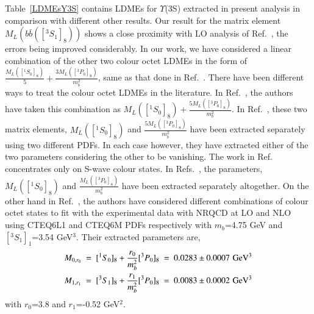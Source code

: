 Table~\ref{LDMEsY3S} contains LDMEs for $\Upsilon$(3S) extracted in present analysis
in comparison with different other results. Our result for the matrix element $M_L(b\bar{b}([^3S_1]_8))$
shows a close proximity with LO analysis of Ref.~\cite{Brateen:PRD2001,Sharma:2012dy}, the errors being improved
considerably.
In our work, we have considered a linear combination of the other two colour octet 
LDMEs in the form of $\frac{M_{L}([^1S_0]_{8})}{5}+\frac{3M_{L}([^3P_0]_{8})}{m_b^2}$, same as that
done in Ref.~\cite{Sharma:2012dy}.
There have been different ways to treat the colour octet LDMEs in the literature.
In Ref.~\cite{Domenech:2000ri}, 
the authors have taken this combination as $M_{L}([^1S_0]_{8})+\frac{5M_{L}([^3P_0]_{8})}{m_b^2}$.
In Ref.~\cite{Brateen:PRD2001}, these two matrix elements,
$M_{L}([^1S_0]_{8})$ and $\frac{5M_{L}([^3P_0]_{8})}{m_b^2}$
have been extracted separately using two different PDFs. In each case however, they have extracted
either of the two parameters considering the other to be vanishing.
The work in Ref.~\cite{Gong:2010bk} concentrates only on S-wave colour states.
In Refs.~\cite{Gong:2013qka,Feng:2015wka},
the parameters, $M_{L}([^1S_0]_{8})$ and $\frac{M_{L}([^3P_0]_{8})}{m_b^2}$ have been extracted
separately altogether. On the other hand in Ref.~\cite{Han:2014kxa}, the authors have
considered different combinations of 
colour octet states to fit with the experimental data with NRQCD at LO and NLO using 
CTEQ6L1 and CTEQ6M PDFs respectively with $m_b$=4.75 GeV and $[^3S_1]_1$=3.54 GeV$^3$.
Their extracted parameters are,
\begin{eqnarray}
  \nonumber
  M_{0,r_0}~=~[^1S_0]_8+\frac{r_0}{m_b^2}[^3P_0]_8~=~0.0283\pm 0.0007{\rm \,\, GeV^3} \nonumber \\
  M_{1,r_1}~=~[^3S_1]_8+\frac{r_1}{m_b^2}[^3P_0]_8~=~0.0083\pm 0.0002{\rm \,\,GeV^3} 
\end{eqnarray}
with $r_0$=3.8 and $r_1$=-0.52 GeV$^2$.

